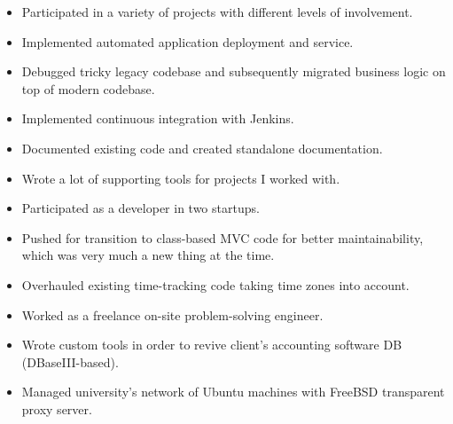 \begin{itemize}
\item Participated in a variety of projects with different levels of involvement.
\item Implemented automated application deployment and service.
\item Debugged tricky legacy codebase and subsequently migrated business logic on top of modern codebase.
\item Implemented continuous integration with Jenkins.
\item Documented existing code and created standalone documentation.
\item Wrote a lot of supporting tools for projects I worked with.
\end{itemize}

\begin{itemize}
\item Participated as a developer in two startups.
\item Pushed for transition to class-based MVC code for better maintainability, which was very much a new thing at the time.
\item Overhauled existing time-tracking code taking time zones into account.
\end{itemize}

\begin{itemize}
\item Worked as a freelance on-site problem-solving engineer.
\item Wrote custom tools in order to revive client's accounting software DB (DBaseIII-based).
\end{itemize}

\begin{itemize}
\item Managed university's network of Ubuntu machines with FreeBSD transparent proxy server.
\end{itemize}

